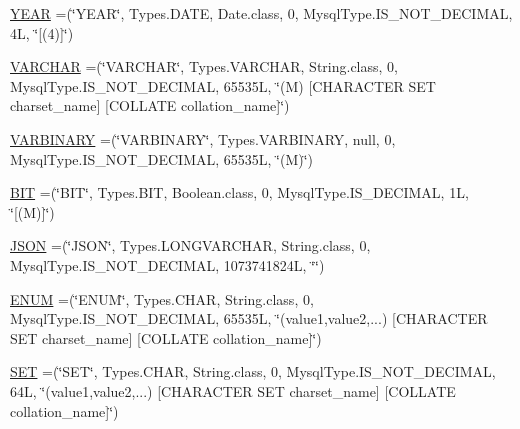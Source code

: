 \begin{DoxyCompactItemize}
\item 
\mbox{\hyperlink{enumcom_1_1mysql_1_1cj_1_1_mysql_type_a58de6bd3431bd81f859926ed489f19c1}{Y\+E\+AR}} =(\char`\"{}Y\+E\+AR\char`\"{}, Types.\+D\+A\+TE, Date.\+class, 0, Mysql\+Type.\+I\+S\+\_\+\+N\+O\+T\+\_\+\+D\+E\+C\+I\+M\+AL, 4\+L, \char`\"{}\mbox{[}(4)\mbox{]}\char`\"{})
\item 
\mbox{\hyperlink{enumcom_1_1mysql_1_1cj_1_1_mysql_type_a46a41a74f7598b207cfc15b8fdf3cd34}{V\+A\+R\+C\+H\+AR}} =(\char`\"{}V\+A\+R\+C\+H\+AR\char`\"{}, Types.\+V\+A\+R\+C\+H\+AR, String.\+class, 0, Mysql\+Type.\+I\+S\+\_\+\+N\+O\+T\+\_\+\+D\+E\+C\+I\+M\+AL, 65535\+L, \char`\"{}(\+M) \mbox{[}\+C\+H\+A\+R\+A\+C\+T\+E\+R S\+E\+T charset\+\_\+name\mbox{]} \mbox{[}\+C\+O\+L\+L\+A\+T\+E collation\+\_\+name\mbox{]}\char`\"{})
\item 
\mbox{\hyperlink{enumcom_1_1mysql_1_1cj_1_1_mysql_type_a8178476164112332f2b676c85c208baa}{V\+A\+R\+B\+I\+N\+A\+RY}} =(\char`\"{}V\+A\+R\+B\+I\+N\+A\+RY\char`\"{}, Types.\+V\+A\+R\+B\+I\+N\+A\+RY, null, 0, Mysql\+Type.\+I\+S\+\_\+\+N\+O\+T\+\_\+\+D\+E\+C\+I\+M\+AL, 65535\+L, \char`\"{}(\+M)\char`\"{})
\item 
\mbox{\hyperlink{enumcom_1_1mysql_1_1cj_1_1_mysql_type_aec2c26d184d9541cf9ba34c0325d0b18}{B\+IT}} =(\char`\"{}B\+IT\char`\"{}, Types.\+B\+IT, Boolean.\+class, 0, Mysql\+Type.\+I\+S\+\_\+\+D\+E\+C\+I\+M\+AL, 1\+L, \char`\"{}\mbox{[}(\+M)\mbox{]}\char`\"{})
\item 
\mbox{\hyperlink{enumcom_1_1mysql_1_1cj_1_1_mysql_type_a876e47530339c8cb791613d5a0d04f63}{J\+S\+ON}} =(\char`\"{}J\+S\+ON\char`\"{}, Types.\+L\+O\+N\+G\+V\+A\+R\+C\+H\+AR, String.\+class, 0, Mysql\+Type.\+I\+S\+\_\+\+N\+O\+T\+\_\+\+D\+E\+C\+I\+M\+AL, 1073741824\+L, \char`\"{}\char`\"{})
\item 
\mbox{\hyperlink{enumcom_1_1mysql_1_1cj_1_1_mysql_type_a6173f156b78f3888f9c2073ccd3fda1a}{E\+N\+UM}} =(\char`\"{}E\+N\+UM\char`\"{}, Types.\+C\+H\+AR, String.\+class, 0, Mysql\+Type.\+I\+S\+\_\+\+N\+O\+T\+\_\+\+D\+E\+C\+I\+M\+AL, 65535\+L, \char`\"{}(\textquotesingle{}value1\textquotesingle{},\textquotesingle{}value2\textquotesingle{},...) \mbox{[}\+C\+H\+A\+R\+A\+C\+T\+E\+R S\+E\+T charset\+\_\+name\mbox{]} \mbox{[}\+C\+O\+L\+L\+A\+T\+E collation\+\_\+name\mbox{]}\char`\"{})
\item 
\mbox{\hyperlink{enumcom_1_1mysql_1_1cj_1_1_mysql_type_acf82f4d6ab19d38105ae67f3d1561c8e}{S\+ET}} =(\char`\"{}S\+ET\char`\"{}, Types.\+C\+H\+AR, String.\+class, 0, Mysql\+Type.\+I\+S\+\_\+\+N\+O\+T\+\_\+\+D\+E\+C\+I\+M\+AL, 64\+L, \char`\"{}(\textquotesingle{}value1\textquotesingle{},\textquotesingle{}value2\textquotesingle{},...) \mbox{[}\+C\+H\+A\+R\+A\+C\+T\+E\+R S\+E\+T charset\+\_\+name\mbox{]} \mbox{[}\+C\+O\+L\+L\+A\+T\+E collation\+\_\+name\mbox{]}\char`\"{})

\end{DoxyCompactItemize}
